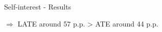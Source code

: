 \documentclass[aspectratio=169,9pt,dvipsnames]{beamer}
\begin{document}
\begin{frame}{Self-interest - Results}
{}

$\Rightarrow$ LATE around 57 p.p. > ATE around 44 p.p.

\medskip

\hyperlink{first_stage_si}{}

    \end{frame}













\end{document}
